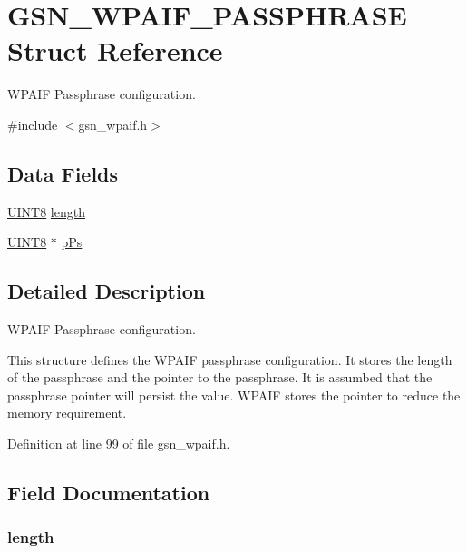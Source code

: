 \hypertarget{a00424}{
\section{GSN\_\-WPAIF\_\-PASSPHRASE Struct Reference}
\label{a00424}
}


WPAIF Passphrase configuration.  




{\ttfamily \#include $<$gsn\_\-wpaif.h$>$}

\subsection*{Data Fields}
\begin{DoxyCompactItemize}
\item 
\hyperlink{a00660_gab27e9918b538ce9d8ca692479b375b6a}{UINT8} \hyperlink{a00424_ae360fb41f422c7c83b87d9af070cbd31}{length}
\item 
\hyperlink{a00660_gab27e9918b538ce9d8ca692479b375b6a}{UINT8} $\ast$ \hyperlink{a00424_a916d4c92b0a0046ea32524b00ef14469}{pPs}
\end{DoxyCompactItemize}


\subsection{Detailed Description}
WPAIF Passphrase configuration. 

This structure defines the WPAIF passphrase configuration. It stores the length of the passphrase and the pointer to the passphrase. It is assumbed that the passphrase pointer will persist the value. WPAIF stores the pointer to reduce the memory requirement. 

Definition at line 99 of file gsn\_\-wpaif.h.



\subsection{Field Documentation}
\hypertarget{a00424_ae360fb41f422c7c83b87d9af070cbd31}{
\subsubsection[{length}]{ {\bf length}}}
\label{a00424_ae360fb41f422c7c83b87d9af070cbd31}


